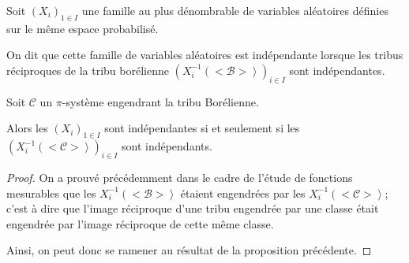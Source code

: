 \begin{de}
Soit $(X_i)_{1 \in I}$ une famille au plus dénombrable de variables aléatoires définies sur le même espace probabilisé.

On dit que cette famille de variables aléatoires est indépendante lorsque les tribus réciproques de la tribu borélienne $\left(X_i^{-1}\left(<\mathcal{B}>\right>\right)_{i \in I}$ sont indépendantes.
\end{de}

\begin{prop}
Soit $\mathcal{C}$ un $\pi$-système engendrant la tribu Borélienne.

Alors les $(X_i)_{1 \in I}$ sont indépendantes si et seulement si les $\left(X_i^{-1}\left(<\mathcal{C}>\right>\right)_{i \in I}$ sont indépendants.
\end{prop}


\begin{proof}
On a prouvé précédemment dans le cadre de l'étude de fonctions mesurables que les $X_i^{-1}\left(<\mathcal{B}>\right>$ étaient engendrées par les $X_i^{-1}\left(<\mathcal{C}>\right>$; c'est à dire que l'image réciproque d'une tribu engendrée par une classe était engendrée par l'image réciproque de cette même classe.

Ainsi, on peut donc se ramener au résultat de la proposition précédente.
\end{proof}

